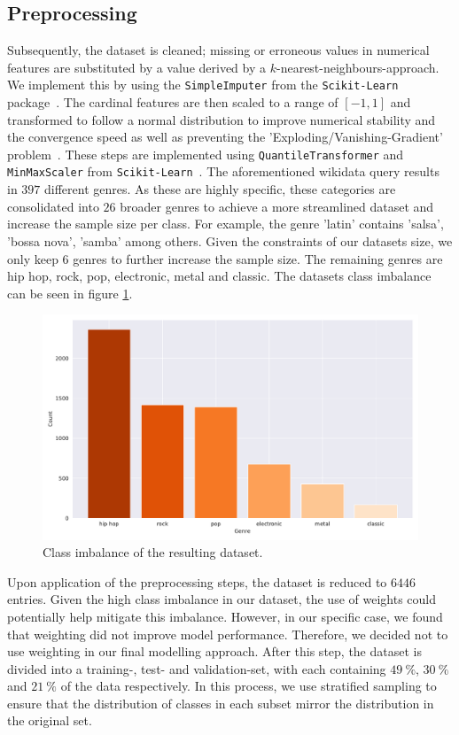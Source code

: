 \documentclass[
  12pt,
  bibliography=totoc,     %
  captions=tableheading,  %
  titlepage=firstiscover, %
]{scrartcl}
\begin{document}
\subsection{Preprocessing}
Subsequently, the dataset is cleaned; missing or erroneous values
in numerical features are substituted by a value derived by a $k$-nearest-neighbours-approach. We implement this
by using the \texttt{SimpleImputer} from the \texttt{Scikit-Learn} package~\cite{scikit-learn}.
The cardinal features are then scaled to a range of $[-1,1]$ and transformed to follow a normal distribution to improve numerical stability
and the convergence speed as well as preventing the 'Exploding/Vanishing-Gradient' problem~\cite{geron}. These steps are implemented using \texttt{QuantileTransformer} and
\texttt{MinMaxScaler} from \texttt{Scikit-Learn}~\cite{scikit-learn}.
The aforementioned wikidata query results in $397$ different genres. As these are highly specific, these categories are consolidated into $26$ broader genres to
achieve a more streamlined dataset and increase the sample size per class. For example, the genre 'latin' contains 'salsa', 'bossa nova', 'samba' among others.
Given the constraints of our datasets size, we only keep $6$ genres to further increase the sample
size. The remaining genres are hip hop, rock, pop, electronic, metal and classic. The datasets class imbalance can be seen in figure \ref{fig:class-imbalance}.
\FloatBarrier
\begin{figure}[h]
  \centering
  \includegraphics[scale=0.6]{figures/genre_hist_oranges.pdf}
  \caption{Class imbalance of the resulting dataset.}
  \label{fig:class-imbalance}
\end{figure}
\FloatBarrier
\noindent
Upon application of the preprocessing steps, the dataset is reduced to $6446$ entries.
Given the high class imbalance in our dataset, the use of weights could potentially help mitigate this imbalance. However, in our specific case, we found that weighting did not improve model performance. Therefore, we decided not to use weighting in our final modelling approach.
After this step, the dataset is divided into a training-, test- and validation-set, with each containing $\SI{49}{\percent}$, $\SI{30}{\percent}$ and $\SI{21}{\percent}$
of the data respectively. In this process, we use stratified sampling to ensure that the distribution of classes in each subset mirror the distribution in the original
set.
\end{document}
